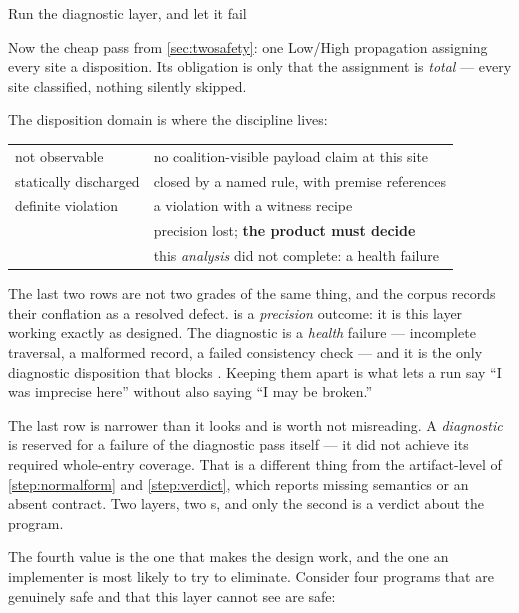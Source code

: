 \begin{step}{Run the diagnostic layer, and let it fail}{%
}
\label{step:diag}

Now the cheap pass from \cref{sec:twosafety}: one \textsf{Low}/\textsf{High}
propagation assigning every site a disposition. Its obligation is only that the
assignment is \emph{total} --- every site classified, nothing silently skipped.

The disposition domain is where the discipline lives:

\begin{center}
\begin{tabular}{@{}ll@{}}
\toprule
not observable & no coalition-visible payload claim at this site \\
statically discharged & closed by a named rule, with premise references \\
definite violation & a violation with a witness recipe \\
\RelReq{} & precision lost; \textbf{the product must decide} \\
\Unknown{} & this \emph{analysis} did not complete: a health failure \\
\bottomrule
\end{tabular}
\end{center}

The last two rows are not two grades of the same thing, and the corpus records
their conflation as a resolved defect. \RelReq{} is a \emph{precision} outcome:
it is this layer working exactly as designed. The diagnostic \Unknown{} is a
\emph{health} failure --- incomplete traversal, a malformed record, a failed
consistency check --- and it is the only diagnostic disposition that blocks
\Proved{}. Keeping them apart is what lets a run say ``I was imprecise here''
without also saying ``I may be broken.''

The last row is narrower than it looks and is worth not misreading. A
\emph{diagnostic} \Unknown{} is reserved for a failure of the diagnostic pass
itself --- it did not achieve its required whole-entry coverage. That is a
different thing from the artifact-level \Unknown{} of \cref{step:normalform} and
\cref{step:verdict}, which reports missing semantics or an absent contract. Two
layers, two \Unknown{}s, and only the second is a verdict about the program.

The fourth value is the one that makes the design work, and the one an
implementer is most likely to try to eliminate. Consider four programs that are
genuinely safe and that this layer cannot see are safe:


\end{step}
